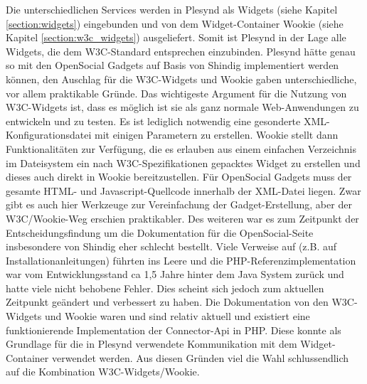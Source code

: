Die unterschiedlichen Services werden in Plesynd als Widgets (siehe Kapitel \ref{section:widgets}) eingebunden und von dem Widget-Container Wookie (siehe Kapitel \ref{section:w3c_widgets}) ausgeliefert. Somit ist Plesynd in der Lage alle Widgets, die dem W3C-Standard entsprechen einzubinden. Plesynd hätte genau so mit den OpenSocial Gadgets auf Basis von Shindig implementiert werden können, den Auschlag für die W3C-Widgets und Wookie gaben unterschiedliche, vor allem praktikable Gründe. Das wichtigeste Argument für die Nutzung von W3C-Widgets ist, dass es möglich ist sie als ganz normale Web-Anwendungen zu entwickeln und zu testen. Es ist lediglich notwendig eine gesonderte XML-Konfigurationsdatei mit einigen Parametern zu erstellen. Wookie stellt dann Funktionalitäten zur Verfügung, die es erlauben aus einem einfachen Verzeichnis im Dateisystem ein nach W3C-Spezifikationen gepacktes Widget zu erstellen und dieses auch direkt in Wookie bereitzustellen. Für OpenSocial Gadgets muss der gesamte HTML- und Javascript-Quellcode innerhalb der XML-Datei liegen. Zwar gibt es auch hier Werkzeuge zur Vereinfachung der Gadget-Erstellung, aber der W3C/Wookie-Weg erschien praktikabler. Des weiteren war es zum Zeitpunkt der Entscheidungsfindung um die Dokumentation für die OpenSocial-Seite insbesondere von Shindig eher schlecht bestellt. Viele Verweise auf (z.B. auf Installationanleitungen) führten ins Leere und die PHP-Referenzimplementation war vom Entwicklungsstand ca 1,5 Jahre hinter dem Java System zurück und hatte viele nicht behobene Fehler. Dies scheint sich jedoch zum aktuellen Zeitpunkt geändert und verbessert zu haben. Die Dokumentation von den W3C-Widgets und Wookie waren und sind relativ aktuell und existiert eine funktionierende Implementation der Connector-Api in PHP. Diese konnte als Grundlage für die in Plesynd verwendete Kommunikation mit dem Widget-Container verwendet werden. Aus diesen Gründen viel die Wahl schlussendlich auf die Kombination W3C-Widgets/Wookie.

